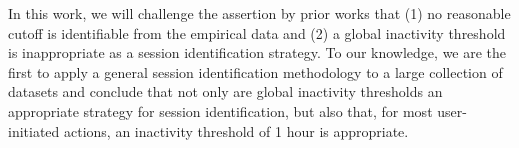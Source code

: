 In this work, we will challenge the assertion by prior works that (1) no reasonable cutoff is identifiable from the empirical data and (2) a global inactivity threshold is inappropriate as a session identification strategy.  To our knowledge, we are the first to apply a general session identification methodology to a large collection of datasets and conclude that not only are global inactivity thresholds an appropriate strategy for session identification, but also that, for most user-initiated actions, an inactivity threshold of 1 hour is appropriate.
